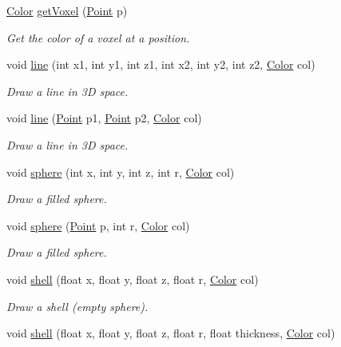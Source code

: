 \begin{DoxyCompactItemize}
\mbox{\hyperlink{structColor}{Color}} \mbox{\hyperlink{classCube_a975fe9a893595160a1726612b1c57717}{get\+Voxel}} (\mbox{\hyperlink{structPoint}{Point}} p)
\begin{DoxyCompactList}\small\item\em Get the color of a voxel at a position. \end{DoxyCompactList}\item 
void \mbox{\hyperlink{classCube_ade358055f1da9f4bc5d577c841696c4e}{line}} (int x1, int y1, int z1, int x2, int y2, int z2, \mbox{\hyperlink{structColor}{Color}} col)
\begin{DoxyCompactList}\small\item\em Draw a line in 3D space. \end{DoxyCompactList}\item 
void \mbox{\hyperlink{classCube_a1ba4010e9d87479da5a340bddbcbf622}{line}} (\mbox{\hyperlink{structPoint}{Point}} p1, \mbox{\hyperlink{structPoint}{Point}} p2, \mbox{\hyperlink{structColor}{Color}} col)
\begin{DoxyCompactList}\small\item\em Draw a line in 3D space. \end{DoxyCompactList}\item 
void \mbox{\hyperlink{classCube_a1e67b5e360c10bae9f58bd4b09b980a1}{sphere}} (int x, int y, int z, int r, \mbox{\hyperlink{structColor}{Color}} col)
\begin{DoxyCompactList}\small\item\em Draw a filled sphere. \end{DoxyCompactList}\item 
void \mbox{\hyperlink{classCube_af9f95704e15b96cc682e58e8e251525a}{sphere}} (\mbox{\hyperlink{structPoint}{Point}} p, int r, \mbox{\hyperlink{structColor}{Color}} col)
\begin{DoxyCompactList}\small\item\em Draw a filled sphere. \end{DoxyCompactList}\item 
void \mbox{\hyperlink{classCube_a3bdcd1e0615a67aa2dbaf44c33714da0}{shell}} (float x, float y, float z, float r, \mbox{\hyperlink{structColor}{Color}} col)
\begin{DoxyCompactList}\small\item\em Draw a shell (empty sphere). \end{DoxyCompactList}\item 
void \mbox{\hyperlink{classCube_a99a38e0467482c71881f05d281f08aba}{shell}} (float x, float y, float z, float r, float thickness, \mbox{\hyperlink{structColor}{Color}} col)

\end{DoxyCompactItemize}
